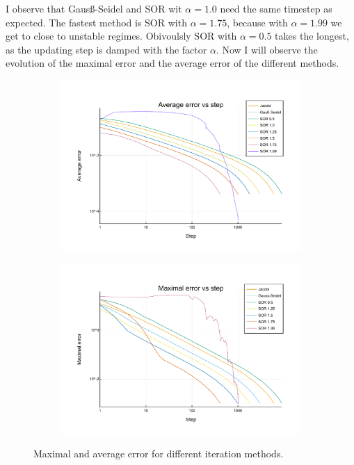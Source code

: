 \documentclass[
	a4paper, %
	10pt, %
]{CSUniSchoolLabReport}
\begin{document}
I observe that Gausß-Seidel and SOR wit $\alpha=1.0$ need the same timestep as expected. The fastest method is SOR with  $\alpha=1.75$, because with $\alpha=1.99$ we get to close to unstable regimes. Obivoulsly SOR with $\alpha=0.5$ takes the longest, as the updating step is damped with the factor $\alpha$. Now I will observe the evolution of the maximal error and the average error of the different methods.

\begin{figure}[H]
	\centering
	\begin{subfigure}[b]{0.49\textwidth}
			\centering
			\includegraphics[width=\textwidth]{../saves_t1/av_errors_comp.pdf}
			\label{fig:av_errors}
	\end{subfigure}
	\hfill
	\begin{subfigure}[b]{0.49\textwidth}
			\centering
			\includegraphics[width=\textwidth]{../saves_t1/max_errors_comp.pdf}
			\label{fig:max_errors}
	\end{subfigure}
	\caption{Maximal and average error for different iteration methods.}
	\label{fig:errors}
\end{figure}
\end{document}
